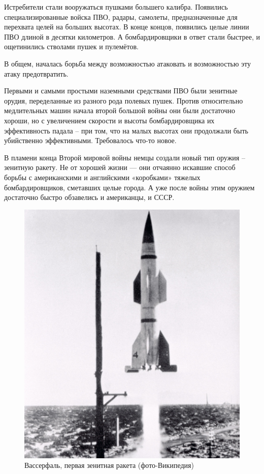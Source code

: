 Истребители стали вооружаться пушками большего калибра. Появились специализированные войска ПВО, радары, самолеты, предназначенные для перехвата целей на больших высотах. В конце концов, появились целые линии ПВО длиной в десятки километров. А бомбардировщики в ответ стали быстрее, и ощетинились стволами пушек и пулемётов.

В общем, началась борьба между возможностью атаковать и возможностью эту атаку предотвратить.

Первыми и самыми простыми наземными средствами ПВО были зенитные орудия, переделанные из разного рода полевых пушек. Против относительно медлительных машин начала второй большой войны они были достаточно хороши, но с увеличением скорости и высоты бомбардировщика их эффективность падала – при том, что на малых высотах они продолжали быть убийственно эффективными. Требовалось что-то новое.

В пламени конца Второй мировой войны немцы создали новый тип оружия – зенитную ракету. Не от хорошей жизни — они отчаянно искавшие способ борьбы с американскими и английскими «коробками» тяжелых бомбардировщиков, сметавших целые города. А уже после войны этим оружием достаточно быстро обзавелись и американцы, и СССР.

\begin{figure}[h!tb] 
	\centering\includegraphics[scale=0.3]{Bekaa_1/zqp4x9QzIUI.jpg}
	\caption{Вассерфаль, первая зенитная ракета (фото-Википедия)}%
\end{figure}

